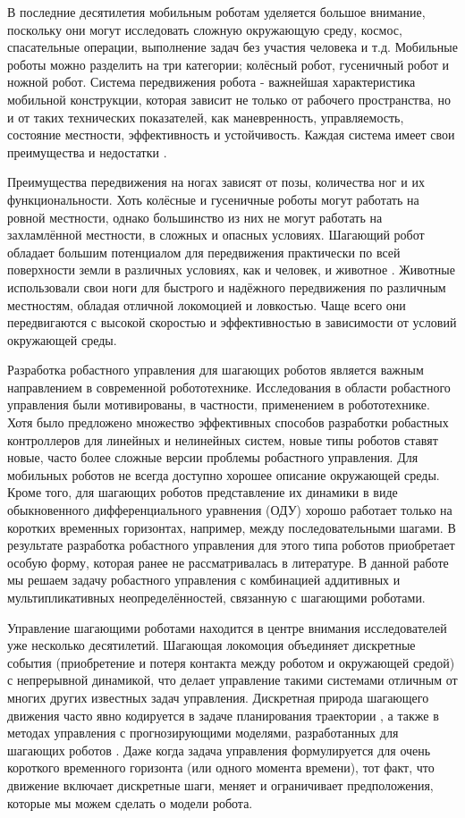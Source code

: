
{\actuality} 
В последние десятилетия мобильным роботам уделяется большое внимание, поскольку они могут исследовать сложную окружающую среду, космос, спасательные операции, выполнение задач без участия человека и т.д. Мобильные роботы можно разделить на три категории; колёсный робот, гусеничный робот и ножной робот. Система передвижения робота - важнейшая характеристика мобильной конструкции, которая зависит не только от рабочего пространства, но и от таких технических показателей, как маневренность, управляемость, состояние местности, эффективность и устойчивость. Каждая система имеет свои преимущества и недостатки \cite{zhong2019}.

Преимущества передвижения на ногах зависят от позы, количества ног и их функциональности. Хоть колёсные и гусеничные роботы могут работать на ровной местности, однако большинство из них не могут работать на захламлённой местности, в сложных и опасных условиях. Шагающий робот обладает большим потенциалом для передвижения практически по всей поверхности земли в различных условиях, как и человек, и животное \cite{Silva2012}. Животные использовали свои ноги для быстрого и надёжного передвижения по различным местностям, обладая отличной локомоцией и ловкостью. Чаще всего они передвигаются с высокой скоростью и эффективностью в зависимости от условий окружающей среды.

Разработка робастного управления для шагающих роботов является важным направлением в современной робототехнике. Исследования в области робастного управления были мотивированы, в частности, применением в робототехнике. Хотя было предложено множество эффективных способов разработки робастных контроллеров для линейных \cite{POLYAK2021,Nicolett2018} и нелинейных \cite{HAUSWIRTH2024,Celentano2018} систем, новые типы роботов ставят новые, часто более сложные версии проблемы робастного управления. Для мобильных роботов не всегда доступно хорошее описание окружающей среды. Кроме того, для шагающих роботов представление их динамики в виде обыкновенного дифференциального уравнения (ОДУ) хорошо работает только на коротких временных горизонтах, например, между последовательными шагами. В результате разработка робастного управления для этого типа роботов приобретает особую форму, которая ранее не рассматривалась в литературе. В данной работе мы решаем задачу робастного управления с комбинацией аддитивных и мультипликативных неопределённостей, связанную с шагающими роботами.

Управление шагающими роботами находится в центре внимания исследователей уже несколько десятилетий. Шагающая локомоция объединяет дискретные события (приобретение и потеря контакта между роботом и окружающей средой) с непрерывной динамикой, что делает управление такими системами отличным от многих других известных задач управления. Дискретная природа шагающего движения часто явно кодируется в задаче планирования траектории \cite{katayama2022whole, lu2023whole}, а также в методах управления с прогнозирующими моделями, разработанных для шагающих роботов \cite{KIM2019, chignoli2021humanoid}. Даже когда задача управления формулируется для очень короткого временного горизонта (или одного момента времени), тот факт, что движение включает дискретные шаги, меняет и ограничивает предположения, которые мы можем сделать о модели робота.


